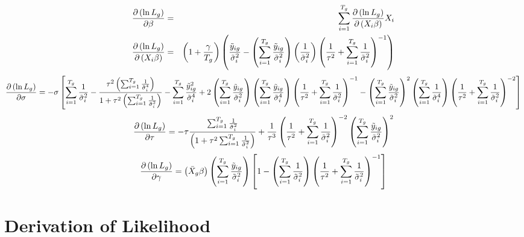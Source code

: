 \documentclass[12pt]{article}
\begin{document}
\begin{eqnarray*}
\frac{\partial \left( \ln L_{g}\right) }{\partial \beta } &=&%
\sum_{i=1}^{T_{g}}\frac{\partial \left( \ln L_{g}\right) }{\partial \left(
X_{i}\beta \right) }X_{i} \\
\frac{\partial \left( \ln L_{g}\right) }{\partial \left( X_{i}\beta \right) }
&=&\left( 1+\frac{\gamma }{T_{g}}\right) \left( \frac{\tilde{y}_{ig}}{\tilde{%
\sigma}_{i}^{2}}-\left( \sum_{i=1}^{T_{g}}\frac{\tilde{y}_{ig}}{\tilde{\sigma%
}_{i}^{2}}\right) \left( \frac{1}{\tilde{\sigma}_{i}^{2}}\right) \left( 
\frac{1}{\tau ^{2}}+\sum_{i=1}^{T_{g}}\frac{1}{\tilde{\sigma}_{i}^{2}}%
\right) ^{-1}\right)
\end{eqnarray*}%
\[
\frac{\partial \left( \ln L_{g}\right) }{\partial \sigma }=-\sigma \left[
\sum_{i=1}^{T_{g}}\frac{1}{\tilde{\sigma}_{i}^{2}}-\frac{\tau ^{2}\left(
\sum_{i=1}^{T_{g}}\frac{1}{\tilde{\sigma}_{i}^{4}}\right) }{1+\tau
^{2}\left( \sum_{i=1}^{T_{g}}\frac{1}{\tilde{\sigma}_{i}^{2}}\right) }%
-\sum_{i=1}^{T_{g}}\frac{\tilde{y}_{ig}^{2}}{\tilde{\sigma}_{i}^{4}}+2\left(
\sum_{i=1}^{T_{g}}\frac{\tilde{y}_{ig}}{\tilde{\sigma}_{i}^{2}}\right)
\left( \sum_{i=1}^{T_{g}}\frac{\tilde{y}_{ig}}{\tilde{\sigma}_{i}^{4}}%
\right) \left( \frac{1}{\tau ^{2}}+\sum_{i=1}^{T_{g}}\frac{1}{\tilde{\sigma}%
_{i}^{2}}\right) ^{-1}-\left( \sum_{i=1}^{T_{g}}\frac{\tilde{y}_{ig}}{\tilde{%
\sigma}_{i}^{2}}\right) ^{2}\left( \sum_{i=1}^{T_{g}}\frac{1}{\tilde{\sigma}%
_{i}^{4}}\right) \left( \frac{1}{\tau ^{2}}+\sum_{i=1}^{T_{g}}\frac{1}{%
\tilde{\sigma}_{i}^{2}}\right) ^{-2}\right] 
\]%
\[
\frac{\partial \left( \ln L_{g}\right) }{\partial \tau }=-\tau \frac{%
\sum_{i=1}^{T_{g}}\frac{1}{\tilde{\sigma}_{i}^{2}}}{\left( 1+\tau
^{2}\sum_{i=1}^{T_{g}}\frac{1}{\tilde{\sigma}_{i}^{2}}\right) }+\frac{1}{%
\tau ^{3}}\left( \frac{1}{\tau ^{2}}+\sum_{i=1}^{T_{g}}\frac{1}{\tilde{\sigma%
}_{i}^{2}}\right) ^{-2}\left( \sum_{i=1}^{T_{g}}\frac{\tilde{y}_{ig}}{\tilde{%
\sigma}_{i}^{2}}\right) ^{2} 
\]%
\[
\frac{\partial \left( \ln L_{g}\right) }{\partial \gamma }=\left( \bar{X}%
_{g}\beta \right) \left( \sum_{i=1}^{T_{g}}\frac{\tilde{y}_{ig}}{\tilde{%
\sigma}_{i}^{2}}\right) \left[ 1-\left( \sum_{i=1}^{T_{g}}\frac{1}{\tilde{%
\sigma}_{i}^{2}}\right) \left( \frac{1}{\tau ^{2}}+\sum_{i=1}^{T_{g}}\frac{1%
}{\tilde{\sigma}_{i}^{2}}\right) ^{-1}\right] 
\]

\section{Derivation of Likelihood}
\end{document}

